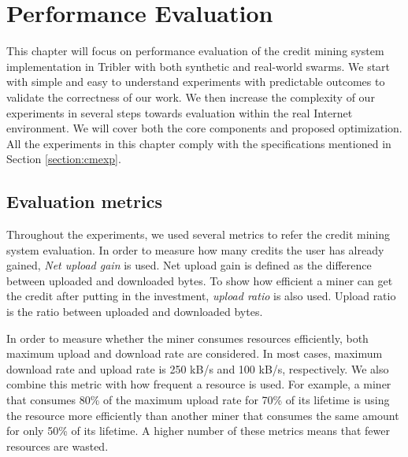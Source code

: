 \chapter{Performance Evaluation}
\label{chp:perfeval}

This chapter will focus on performance evaluation of the credit mining system implementation in Tribler with both synthetic and real-world swarms. We start with simple and easy to understand experiments with predictable outcomes to validate the correctness of our work. We then increase the complexity of our experiments in several steps towards evaluation within the real Internet environment. We will cover both the core components and proposed optimization. All the experiments in this chapter comply with the specifications mentioned in Section \ref{section:cmexp}. 

\section{Evaluation metrics}
\label{section:evalmetrics}
Throughout the experiments, we used several metrics to refer the credit mining system evaluation. In order to measure how many credits the user has already gained, \textit{Net upload gain}\cite{2015:creditmining:capota} is used. Net upload gain is defined as the difference between uploaded and downloaded bytes. To show how efficient a miner can get the credit after putting in the investment, \textit{upload ratio} is also used. Upload ratio is the ratio between uploaded and downloaded bytes.

In order to measure whether the miner consumes resources efficiently, both maximum upload and download rate are considered. In most cases, maximum download rate and upload rate is 250 kB/s and 100 kB/s, respectively. We also combine this metric with how frequent a resource is used. For example, a miner that consumes 80\% of the maximum upload rate for 70\% of its lifetime is using the resource more efficiently than another miner that consumes the same amount for only 50\% of its lifetime. A higher number of these metrics means that fewer resources are wasted. 


